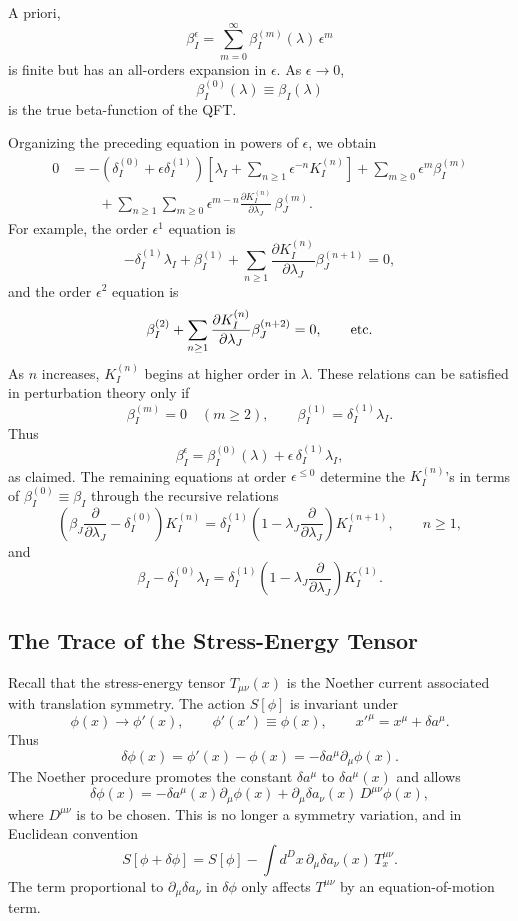 A priori,
\[
  \beta_I^\epsilon
  =
  \sum_{m=0}^\infty \beta_I^{(m)}(\lambda)\,\epsilon^m
\]
is finite but has an all-orders expansion in \(\epsilon\).  As
\(\epsilon\to0\),
\[
  \beta_I^{(0)}(\lambda)\equiv \beta_I(\lambda)
\]
is the true beta-function of the QFT.

Organizing the preceding equation in powers of \(\epsilon\), we obtain
\[
\begin{split}
  0
  &=
  -\left(\delta_I^{(0)}+\epsilon\delta_I^{(1)}\right)
  \left[
    \lambda_I+\sum_{n\geq1}\epsilon^{-n}K_I^{(n)}
  \right]
  +
  \sum_{m\geq0}\epsilon^m\beta_I^{(m)}
\\
  &\hspace{2em}
  +
  \sum_{n\geq1}\sum_{m\geq0}
  \epsilon^{m-n}
  \frac{\partial K_I^{(n)}}{\partial\lambda_J}\,
  \beta_J^{(m)}.
\end{split}
\]
For example, the order \(\epsilon^1\) equation is
\[
  -\delta_I^{(1)}\lambda_I
  +
  \beta_I^{(1)}
  +
  \sum_{n\geq1}
  \frac{\partial K_I^{(n)}}{\partial\lambda_J}
  \beta_J^{(n+1)}
  =
  0,
\]
and the order \(\epsilon^2\) equation is
\[
  \beta_I^{(2)}
  +
  \sum_{n\geq1}
  \frac{\partial K_I^{(n)}}{\partial\lambda_J}
  \beta_J^{(n+2)}
  =
  0,
  \qquad\hbox{etc.}
\]
As \(n\) increases, \(K_I^{(n)}\) begins at higher order in \(\lambda\).
These relations can be satisfied in perturbation theory only if
\[
  \beta_I^{(m)}=0\quad(m\geq2),
  \qquad
  \beta_I^{(1)}=\delta_I^{(1)}\lambda_I.
\]
Thus
\[
  \beta_I^\epsilon
  =
  \beta_I^{(0)}(\lambda)
  +
  \epsilon\,\delta_I^{(1)}\lambda_I,
\]
as claimed.  The remaining equations at order \(\epsilon^{\leq0}\) determine
the \(K_I^{(n)}\)'s in terms of \(\beta_I^{(0)}\equiv\beta_I\) through the
recursive relations
\[
  \left(
    \beta_J\frac{\partial}{\partial\lambda_J}
    -\delta_I^{(0)}
  \right)K_I^{(n)}
  =
  \delta_I^{(1)}
  \left(
    1-\lambda_J\frac{\partial}{\partial\lambda_J}
  \right)K_I^{(n+1)},
  \qquad n\geq1,
\]
and
\[
  \beta_I-\delta_I^{(0)}\lambda_I
  =
  \delta_I^{(1)}
  \left(
    1-\lambda_J\frac{\partial}{\partial\lambda_J}
  \right)K_I^{(1)}.
\]

\subsection{The Trace of the Stress-Energy Tensor}

Recall that the stress-energy tensor \(T_{\mu\nu}(x)\) is the Noether current
associated with translation symmetry.  The action \(S[\phi]\) is invariant
under
\[
  \phi(x)\longrightarrow \phi'(x),
  \qquad
  \phi'(x')\equiv \phi(x),
  \qquad
  x'^\mu=x^\mu+\delta a^\mu.
\]
Thus
\[
  \delta\phi(x)
  =
  \phi'(x)-\phi(x)
  =
  -\delta a^\mu\partial_\mu\phi(x).
\]
The Noether procedure promotes the constant \(\delta a^\mu\) to
\(\delta a^\mu(x)\) and allows
\[
  \delta\phi(x)
  =
  -\delta a^\mu(x)\partial_\mu\phi(x)
  +
  \partial_\mu\delta a_\nu(x)\,D^{\mu\nu}\phi(x),
\]
where \(D^{\mu\nu}\) is to be chosen.  This is no longer a symmetry
variation, and in Euclidean convention
\[
  S[\phi+\delta\phi]
  =
  S[\phi]
  -
  \int d^Dx\,\partial_\mu\delta a_\nu(x)\,
  T_x^{\mu\nu}.
\]
The term proportional to \(\partial_\mu\delta a_\nu\) in \(\delta\phi\) only
affects \(T^{\mu\nu}\) by an equation-of-motion term.

